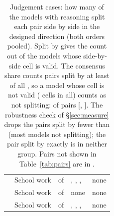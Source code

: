 \begin{table}[t]
\begin{tabular}{llcP{0.4\textwidth}P{0.2\textwidth}}
 & School work & \JudgementConsensusSplitWFour{} of \JudgementConsensusValidWFour{} & , , ,  & none \\
 & School work & \JudgementConsensusSplitWFive{} of \JudgementConsensusValidWFive{} & none & none \\
 & School work & \JudgementConsensusSplitWSix{} of \JudgementConsensusValidWSix{} & , , ,  & none \\
\bottomrule
\end{tabular}
\caption{Judgement cases: how many of the \JudgementConsensusModels{} models with reasoning split each pair side by side in the designed direction (both orders pooled). Split by gives the count out of the models whose side-by-side cell is valid. The consensus share counts pairs split by at least \JudgementConsensusFrom{} of all \JudgementConsensusModels{}, so a model whose cell is not valid (\JudgementConsensusInvalidCells{} cells in all) counts as not splitting: \JudgementConsensusShare{} of pairs [\JudgementConsensusShareLo{}, \JudgementConsensusShareHi{}]. The robustness check of \S\ref{sec:measure} drops the \LowConsensusPairsCount{} pairs split by fewer than \LowConsensusBelow{} (most models not splitting); the \JudgementConsensusNeitherCount{} pair split by exactly \LowConsensusBelow{} is in neither group. Pairs not shown in Table~\ref{tab:pairs} are in \RepoWhere{}.}
\label{tab:judgement-consensus}
\end{table}
